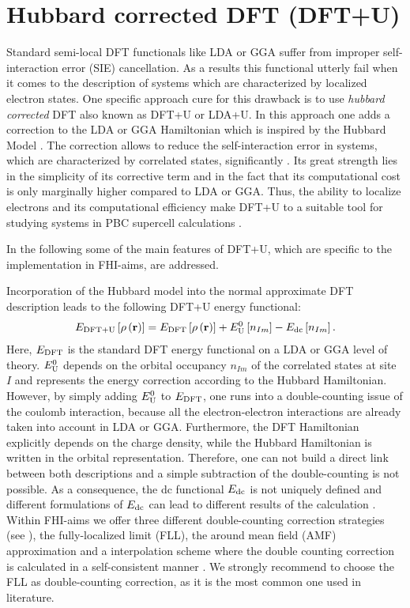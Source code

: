 \section{Hubbard corrected DFT (DFT+U)}
Standard semi-local DFT functionals like LDA or GGA suffer from improper self-interaction error (SIE) cancellation. As a results this functional utterly fail when it comes to the description of systems which are characterized by localized electron states. One specific approach cure for this drawback is to use \textit{hubbard corrected} DFT also known as DFT+U or LDA+U. In this approach one adds a correction to the LDA or GGA Hamiltonian which is inspired by the Hubbard Model \cite{Hubbard238}. The correction allows to reduce the self-interaction error in systems, which are characterized by correlated states, significantly \cite{anisimov_1}. Its great strength lies in the simplicity of its corrective term and in the fact that its computational cost is only marginally higher compared to LDA or GGA. Thus, the ability to localize electrons and its computational efficiency make DFT+U to a suitable tool for studying systems in PBC supercell calculations \cite{QUA:QUA24521}.

In the following some of the main features of DFT+U, which are specific to the implementation in FHI-aims, are addressed.

Incorporation of the Hubbard model into the normal approximate DFT description leads to the following  DFT+U energy functional:
   \begin{align}
   \label{total_dft+u_energy}
      E_{\rm DFT+U} \left[ \rho\left( \mathbf{r}\right) \right] = E_{\rm DFT} \left[ \rho\left( \mathbf{r}\right) \right] + E_{\rm U}^{\rm 0} \left[  n_{Im} \right] - E_{\rm dc}\left[  n_{Im} \right].
   \end{align}
Here, $E_{\rm DFT}$ is the standard DFT energy functional on a LDA or GGA level of theory. $E_{\rm U}^{\rm 0}$ depends on the orbital occupancy $n_{Im}$ of the correlated states at site $I$ and represents the energy correction according to the Hubbard Hamiltonian. However, by simply adding $E_{\rm U}^{\rm 0}$ to $E_{\rm DFT}$, one runs into a double-counting issue of the coulomb interaction, because all the electron-electron interactions are already taken into account in LDA or GGA. Furthermore, the DFT Hamiltonian explicitly depends on the charge density, while the Hubbard Hamiltonian is written in the orbital representation. Therefore, one can not build a direct link between both descriptions and a simple subtraction of the double-counting is not possible. As a consequence, the dc functional $E_{\rm dc}$  is not uniquely defined and different formulations of $E_{\rm dc}$ can lead to different results of the calculation \cite{PhysRevB.79.035103}.  Within FHI-aims we offer three different double-counting correction strategies (see ), the fully-localized limit (FLL), the around mean field (AMF) approximation and a interpolation scheme where the double counting correction is calculated in a self-consistent manner \cite{Petukhov03}. We strongly recommend  to choose the FLL as double-counting correction, as it is the most common one used in literature.

